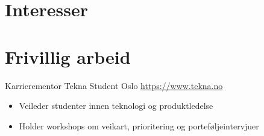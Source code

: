 \documentclass[a4paper, serif, 10pt]{moderncv}
\begin{document}
\section{Interesser}

\section{Frivillig arbeid}

        {Karrierementor}
        {Tekna Student Oslo}
        {\url{https://www.tekna.no}}
        {}
        {\begin{itemize}
\item Veileder studenter innen teknologi og produktledelse
\item Holder workshops om veikart, prioritering og porteføljeintervjuer
\end{itemize}}
    
\end{document}
